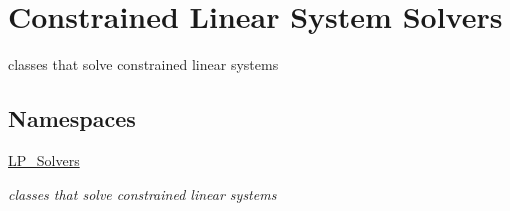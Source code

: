 \hypertarget{group___c_l_s_solvers}{}\section{Constrained Linear System Solvers}
\label{group___c_l_s_solvers}


classes that solve constrained linear systems  


\subsection*{Namespaces}
\begin{DoxyCompactItemize}
\item 
 \hyperlink{namespace_l_p___solvers}{L\+P\+\_\+\+Solvers}
\begin{DoxyCompactList}\small\item\em classes that solve constrained linear systems \end{DoxyCompactList}\end{DoxyCompactItemize}
